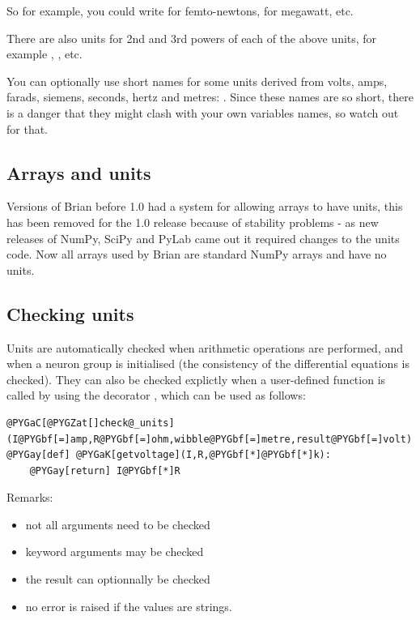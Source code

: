 \documentclass[letterpaper,10pt,english]{manual}
\begin{document}
So for example, you could write  for femto-newtons,  for megawatt, etc.

There are also units for 2nd and 3rd powers of each of the above units, for example
, , etc.

You can optionally use short names for some units derived from volts, amps,
farads, siemens, seconds, hertz and metres:
.
Since these names are so short, there is a danger that they might clash with your
own variables names, so watch out for that.


\subsection{Arrays and units}

Versions of Brian before 1.0 had a system for allowing arrays to have units, this has
been removed for the 1.0 release because of stability problems - as new releases of
NumPy, SciPy and PyLab came out it required changes to the units code. Now all arrays
used by Brian are standard NumPy arrays and have no units.


\subsection{Checking units}

Units are automatically checked when arithmetic operations are performed, and when
a neuron group is initialised (the consistency of the differential equations is checked).
They can also be checked explictly when a user-defined function is called by using the
decorator , which can be used as follows:

\begin{Verbatim}[commandchars=@\[\]]
@PYGaC[@PYGZat[]check@_units](I@PYGbf[=]amp,R@PYGbf[=]ohm,wibble@PYGbf[=]metre,result@PYGbf[=]volt)
@PYGay[def] @PYGaK[getvoltage](I,R,@PYGbf[*]@PYGbf[*]k):
    @PYGay[return] I@PYGbf[*]R
\end{Verbatim}

Remarks:
\begin{itemize}
\item {} 
not all arguments need to be checked

\item {} 
keyword arguments may be checked

\item {} 
the result can optionnally be checked

\item {} 
no error is raised if the values are strings.

\end{itemize}
\end{document}
